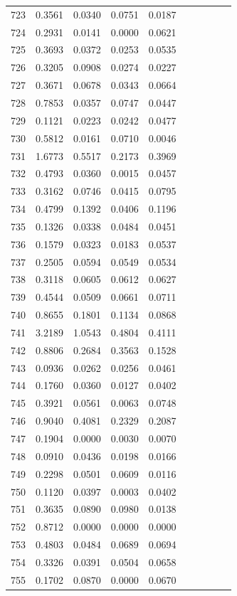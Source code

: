 \begin{table}
\begin{tabular}{cccccccccc}
723& 0.3561& 0.0340& 0.0751& 0.0187\\ 
724& 0.2931& 0.0141& 0.0000& 0.0621\\ 
725& 0.3693& 0.0372& 0.0253& 0.0535\\ 
726& 0.3205& 0.0908& 0.0274& 0.0227\\ 
727& 0.3671& 0.0678& 0.0343& 0.0664\\ 
728& 0.7853& 0.0357& 0.0747& 0.0447\\ 
729& 0.1121& 0.0223& 0.0242& 0.0477\\ 
730& 0.5812& 0.0161& 0.0710& 0.0046\\ 
731& 1.6773& 0.5517& 0.2173& 0.3969\\ 
732& 0.4793& 0.0360& 0.0015& 0.0457\\ 
733& 0.3162& 0.0746& 0.0415& 0.0795\\ 
734& 0.4799& 0.1392& 0.0406& 0.1196\\ 
735& 0.1326& 0.0338& 0.0484& 0.0451\\ 
736& 0.1579& 0.0323& 0.0183& 0.0537\\ 
737& 0.2505& 0.0594& 0.0549& 0.0534\\ 
738& 0.3118& 0.0605& 0.0612& 0.0627\\ 
739& 0.4544& 0.0509& 0.0661& 0.0711\\ 
740& 0.8655& 0.1801& 0.1134& 0.0868\\ 
741& 3.2189& 1.0543& 0.4804& 0.4111\\ 
742& 0.8806& 0.2684& 0.3563& 0.1528\\ 
743& 0.0936& 0.0262& 0.0256& 0.0461\\ 
744& 0.1760& 0.0360& 0.0127& 0.0402\\ 
745& 0.3921& 0.0561& 0.0063& 0.0748\\ 
746& 0.9040& 0.4081& 0.2329& 0.2087\\ 
747& 0.1904& 0.0000& 0.0030& 0.0070\\ 
748& 0.0910& 0.0436& 0.0198& 0.0166\\ 
749& 0.2298& 0.0501& 0.0609& 0.0116\\ 
750& 0.1120& 0.0397& 0.0003& 0.0402\\ 
751& 0.3635& 0.0890& 0.0980& 0.0138\\ 
752& 0.8712& 0.0000& 0.0000& 0.0000\\ 
753& 0.4803& 0.0484& 0.0689& 0.0694\\ 
754& 0.3326& 0.0391& 0.0504& 0.0658\\ 
755& 0.1702& 0.0870& 0.0000& 0.0670\\ 

\end{tabular}
\end{table}
